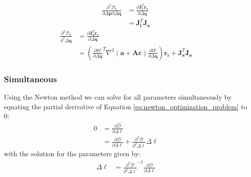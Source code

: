 \begin{equation}
    \begin{aligned}
		\frac{\partial^2 \mathcal{D}_b}{\partial \Delta \mathbf{p} \partial \Delta \mathbf{q}} & =  \frac{\partial \mathbf{J}_{\mathbf{i}}^T \mathbf{r}_b}{\partial \Delta \mathbf{q}}
		\\
		& = \mathbf{J}_{\mathbf{i}}^T \mathbf{J}_{\mathbf{a}}
    \label{eq:bidirectional_hessian_term5}
    \end{aligned}
\end{equation}
\begin{equation}
    \begin{aligned}
		\frac{\partial^2 \mathcal{D}_b}{\partial^2 \Delta \mathbf{q}} & =  \frac{\partial \mathbf{J}_{\mathbf{a}}^T \mathbf{r}_b}{\partial \Delta \mathbf{q}}
		\\
		& = \left( \frac{\partial\mathcal{W}}{\partial \Delta \mathbf{q}}^T \nabla^2 (\mathbf{a} + \mathbf{A}\mathbf{c}) \frac{\partial\mathcal{W}}{\partial \Delta \mathbf{q}} \right) \mathbf{r}_b + \mathbf{J}_{\mathbf{a}}^T \mathbf{J}_{\mathbf{a}}
    \label{q:bidirectional_hessian_term6}
    \end{aligned}
\end{equation}


\subsubsection*{Simultaneous}
\label{sec:newton_simultaneous}

Using the Newton method we can solve for all parameters simultaneously by equating the partial derivative of Equation \ref{eq:newton_optimization_problem} to $0$:
\begin{equation}
    \begin{aligned}
    	0 & = \frac{\partial\hat{\mathcal{D}}}{\partial \Delta \boldsymbol{\ell}}
    	\\
		& = \frac{\partial \mathcal{D}}{\partial \Delta \boldsymbol{\ell}} + \frac{\partial^2 \mathcal{D}}{\partial^2 \Delta \boldsymbol{\ell}} \Delta \boldsymbol{\ell}
    \label{eq:ssd_bc}
    \end{aligned}
\end{equation}
with the solution for the parameters given by:
\begin{equation}
    \begin{aligned}
    	\Delta \boldsymbol{\ell} & = \frac{\partial^2 \mathcal{D}}{\partial^2 \Delta \boldsymbol{\ell}}^{-1} \frac{\partial \mathcal{D}}{\partial \Delta \boldsymbol{\ell}}
    \label{eq:ssd_bc}
    \end{aligned}
\end{equation}

